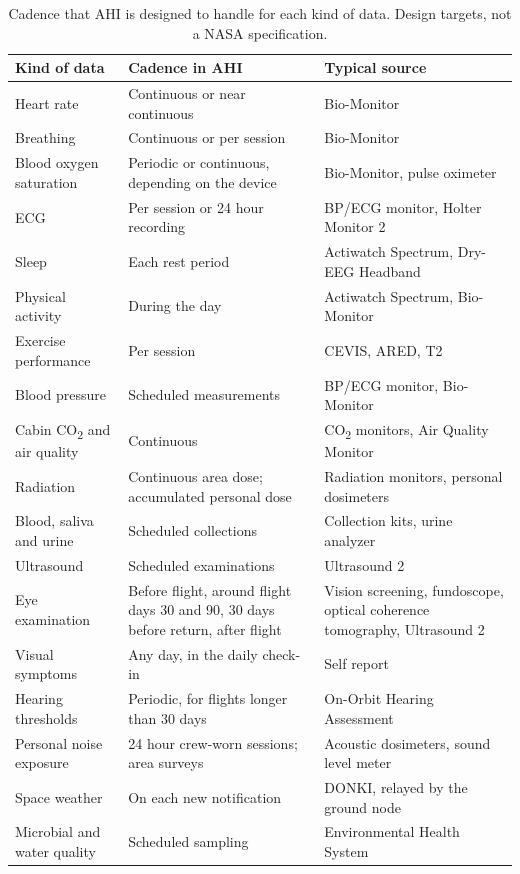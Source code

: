 \begin{table}[htbp]
\centering
\vspace{0.8em}
\caption{Cadence that AHI is designed to handle for each kind of data. Design targets, not a NASA specification.}
\label{tab:frequency}
\small
\begin{tabular}{p{4.6cm}p{4.2cm}p{5.2cm}}
\hline
\textbf{Kind of data} & \textbf{Cadence in AHI} & \textbf{Typical source} \\
\hline
Heart rate & Continuous or near continuous & Bio-Monitor \\
Breathing & Continuous or per session & Bio-Monitor \\
Blood oxygen saturation & Periodic or continuous, depending on the device & Bio-Monitor, pulse oximeter \\
ECG & Per session or 24 hour recording & BP/ECG monitor, Holter Monitor 2 \\
Sleep & Each rest period & Actiwatch Spectrum, Dry-EEG Headband \\
Physical activity & During the day & Actiwatch Spectrum, Bio-Monitor \\
Exercise performance & Per session & CEVIS, ARED, T2 \\
Blood pressure & Scheduled measurements & BP/ECG monitor, Bio-Monitor \\
Cabin CO\textsubscript{2} and air quality & Continuous & CO\textsubscript{2} monitors, Air Quality Monitor \\
Radiation & Continuous area dose; accumulated personal dose & Radiation monitors, personal dosimeters \\
Blood, saliva and urine & Scheduled collections & Collection kits, urine analyzer \\
Ultrasound & Scheduled examinations & Ultrasound 2 \\
Eye examination & Before flight, around flight days 30 and 90, 30 days before return, after flight & Vision screening, fundoscope, optical coherence tomography, Ultrasound 2 \\
Visual symptoms & Any day, in the daily check-in & Self report \\
Hearing thresholds & Periodic, for flights longer than 30 days & On-Orbit Hearing Assessment \\
Personal noise exposure & 24 hour crew-worn sessions; area surveys & Acoustic dosimeters, sound level meter \\
Space weather & On each new notification & DONKI, relayed by the ground node \\
Microbial and water quality & Scheduled sampling & Environmental Health System \\
\hline
\end{tabular}
\vspace{1.2em}
\end{table}

